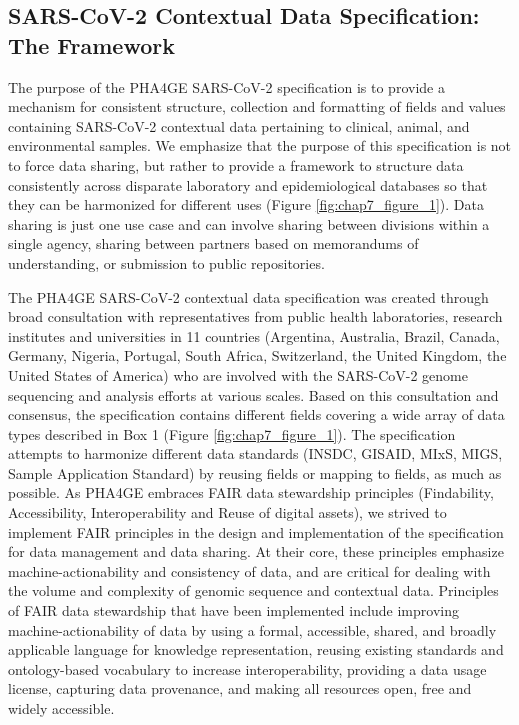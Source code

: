 \subsection{SARS-CoV-2 Contextual Data Specification: The Framework}

The purpose of the PHA4GE SARS-CoV-2 specification is to provide a mechanism for consistent structure, collection and formatting of fields and values containing SARS-CoV-2 contextual data pertaining to clinical, animal, and environmental samples. We emphasize that the purpose of this specification is not to force data sharing, but rather to provide a framework to structure data consistently across disparate laboratory and epidemiological databases so that they can be harmonized for different uses (Figure \ref{fig:chap7_figure_1}). Data sharing is just one use case and can involve sharing between divisions within a single agency, sharing between partners based on memorandums of understanding, or submission to public repositories. 

The PHA4GE SARS-CoV-2 contextual data specification was created through broad consultation with representatives from public health laboratories, research institutes and universities in 11 countries (Argentina, Australia, Brazil, Canada, Germany, Nigeria, Portugal, South Africa, Switzerland, the United Kingdom, the United States of America) who are involved with the SARS-CoV-2 genome sequencing and analysis efforts at various scales. Based on this consultation and consensus, the specification contains different fields covering a wide array of data types described in Box 1 (Figure \ref{fig:chap7_figure_1}). The specification attempts to harmonize different data standards (INSDC, GISAID, MIxS, MIGS, Sample Application Standard) by reusing fields or mapping to fields, as much as possible. As PHA4GE embraces FAIR data stewardship principles (Findability, Accessibility, Interoperability and Reuse of digital assets), we strived to implement FAIR principles in the design and implementation of the specification for data management and data sharing. At their core, these principles emphasize machine-actionability and consistency of data, and are critical for dealing with the volume and complexity of genomic sequence and contextual data. Principles of FAIR data stewardship that have been implemented include improving machine-actionability of data by using a formal, accessible, shared, and broadly applicable language for knowledge representation, reusing existing standards and ontology-based vocabulary to increase interoperability, providing a data usage license, capturing data provenance, and making all resources open, free and widely accessible.

